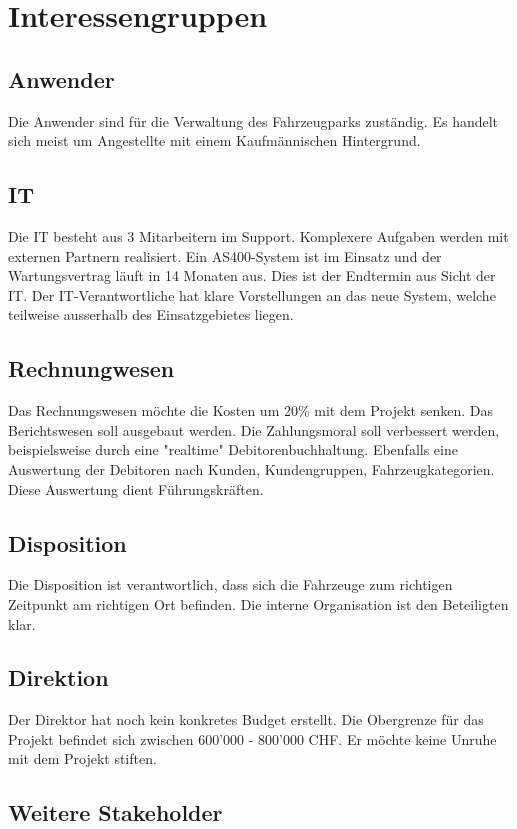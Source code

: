 \section{Interessengruppen}
\subsection{Anwender}
Die Anwender sind für die Verwaltung des Fahrzeugparks zuständig. Es handelt sich meist um Angestellte mit einem Kaufmännischen Hintergrund. 


\subsection{IT}
Die IT besteht aus 3 Mitarbeitern im Support. Komplexere Aufgaben werden mit externen Partnern realisiert. Ein AS400-System ist im Einsatz und der Wartungsvertrag läuft in 14 Monaten aus. Dies ist der Endtermin aus Sicht der IT. Der IT-Verantwortliche hat klare Vorstellungen an das neue System, welche teilweise ausserhalb des Einsatzgebietes liegen. 

\subsection{Rechnungwesen}
Das Rechnungswesen möchte die Kosten um 20\% mit dem Projekt senken. Das Berichtswesen soll ausgebaut werden. Die Zahlungsmoral soll verbessert werden, beispielsweise durch eine "realtime" Debitorenbuchhaltung. Ebenfalls eine Auswertung der Debitoren nach Kunden, Kundengruppen, Fahrzeugkategorien. Diese Auswertung dient Führungskräften. 

\subsection{Disposition}
Die Disposition ist verantwortlich, dass sich die Fahrzeuge zum richtigen Zeitpunkt am richtigen Ort befinden. Die interne Organisation ist den Beteiligten klar. 

\subsection{Direktion}
Der Direktor hat noch kein konkretes Budget erstellt. Die Obergrenze für das Projekt befindet sich zwischen 600'000 - 800'000 CHF. Er möchte keine Unruhe mit dem Projekt stiften. 

\subsection{Weitere Stakeholder}